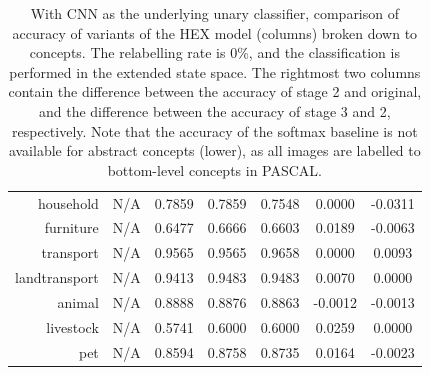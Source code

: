 \documentclass[11pt,a4paper]{book}
\begin{document}
\begin{table}[htbp]
\begin{tabular}{r|c|c|c|c|c|c}
household     & N/A    & 0.7859 & 0.7859 & 0.7548 & 0.0000 & -0.0311\\
furniture     & N/A    & 0.6477 & 0.6666 & 0.6603 & 0.0189 & -0.0063\\
transport     & N/A    & 0.9565 & 0.9565 & 0.9658 & 0.0000 & 0.0093\\
landtransport & N/A    & 0.9413 & 0.9483 & 0.9483 & 0.0070 & 0.0000\\
animal        & N/A    & 0.8888 & 0.8876 & 0.8863 & -0.0012 & -0.0013\\
livestock     & N/A    & 0.5741 & 0.6000 & 0.6000 & 0.0259 & 0.0000\\
pet           & N/A    & 0.8594 & 0.8758 & 0.8735 & 0.0164 & -0.0023
\end{tabular}
\caption{With CNN as the underlying unary classifier, comparison of accuracy of variants of the HEX model (columns) broken down to concepts. The relabelling rate is 0\%, and the classification is performed in the extended state space. The rightmost two columns contain the difference between the accuracy of stage 2 and original, and the difference between the accuracy of stage 3 and 2, respectively. Note that the accuracy of the softmax baseline is not available for abstract concepts (lower), as all images are labelled to bottom-level concepts in PASCAL.}
\label{tab:cnn0acc}
\end{table}
\end{document}
